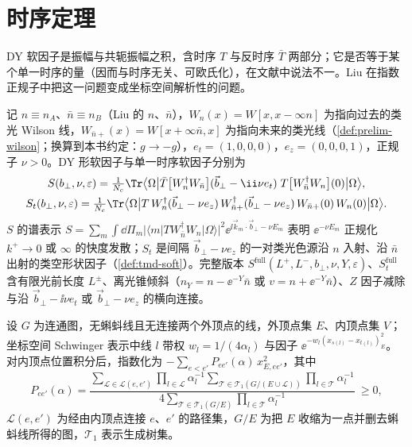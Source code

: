 \section{时序定理}\label{sec:yzliu-time-ordering}

DY 软因子是振幅与共轭振幅之积，含时序 $T$ 与反时序 $\bar T$ 两部分；它是否等于某个单一时序的量（因而与时序无关、可欧氏化），在文献中说法不一\cite{Moult:2018jzp}。Liu 在指数正规子中把这一问题变成坐标空间解析性的问题\cite{Liu:2023pjb}。

\begin{definition}[指数正规子下的软因子]\label{def:yzliu-exp-soft}
记 $n\equiv n_A$、$\bar n\equiv n_B$（Liu 的 $n$、$\bar n$），$W_n(x)=W[x,x-\infty n]$ 为指向过去的类光 Wilson 线，$W_{\bar n+}(x)=W[x+\infty\bar n,x]$ 为指向未来的类光线（\cref{def:prelim-wilson}；换算到本书约定：$g\to-g$），$e_t=(1,0,0,0)$，$e_z=(0,0,0,1)$，正规子 $\nu>0$\cite{Li:2016axz}。DY 形软因子与单一时序软因子分别为\cite[式~(3.7)、(3.20)]{Liu:2023pjb}
\begin{gather}
S(b_\perp,\nu,\varepsilon)=\tfrac{1}{N_c}\Tr\big\langle\Omega\big|\bar T\big[W_n^\dagger W_{\bar n}\big](\vec b_\perp-\ii\nu e_t)\;T\big[W_{\bar n}^\dagger W_n\big](0)\big|\Omega\big\rangle ,\label{eq:yzliu-S-exp}\\
S_t(b_\perp,\nu,\varepsilon)=\tfrac{1}{N_c}\Tr\big\langle\Omega\big|T\,W_n^\dagger(\vec b_\perp-\nu e_z)\,W_{\bar n+}^\dagger(\vec b_\perp-\nu e_z)\,W_{\bar n+}(0)\,W_n(0)\big|\Omega\big\rangle .\label{eq:yzliu-St}
\end{gather}
$S$ 的谱表示 $S=\sum_m\int\dd\Pi_m|\langle m|TW_{\bar n}^\dagger W_n|\Omega\rangle|^2\ee^{\ii\vec k_m\cdot\vec b_\perp-\nu E_m}$ 表明 $\ee^{-\nu E_m}$ 正规化 $k^+\to0$ 或 $\infty$ 的快度发散；$S_t$ 是间隔 $\vec b_\perp-\nu e_z$ 的一对类光色源沿 $n$ 入射、沿 $\bar n$ 出射的类空形状因子（\cref{def:tmd-soft}）。完整版本 $S^{\mathrm{full}}(L^+,L^-,b_\perp,\nu,Y,\varepsilon)$、$S_t^{\mathrm{full}}$ 含有限光前长度 $L^\pm$、离光锥倾斜（$n_Y=n-\ee^{-Y}\bar n$ 或 $v=n+\ee^{-Y}\bar n$）、$Z$ 因子减除与沿 $\vec b_\perp-\ii\nu e_t$ 或 $\vec b_\perp-\nu e_z$ 的横向连接。
\end{definition}

\begin{lemma}\label{lem:yzliu-matrix-tree}
设 $G$ 为连通图，无蝌蚪线且无连接两个外顶点的线，外顶点集 $E$、内顶点集 $V$；坐标空间 Schwinger 表示中线 $l$ 带权 $w_l=1/(4\alpha_l)$ 与因子 $\ee^{-w_l(x_{s(l)}-x_{t(l)})^2_E}$。对内顶点位置积分后，指数化为 $-\sum_{e<e'}P_{ee'}(\alpha)\,x^2_{E,ee'}$，其中
\begin{equation}\label{eq:yzliu-Pee}
P_{ee'}(\alpha)=\frac{\sum_{\mathcal L\in\mathcal L(e,e')}\prod_{l\in\mathcal L}\alpha_l^{-1}\sum_{\mathcal T\in\mathcal T_1(G/(E\cup\mathcal L))}\prod_{l\in\mathcal T}\alpha_l^{-1}}{4\sum_{\mathcal T\in\mathcal T_1(G/E)}\prod_{l\in\mathcal T}\alpha_l^{-1}}\ \ge0 ,
\end{equation}
$\mathcal L(e,e')$ 为经由内顶点连接 $e$、$e'$ 的路径集，$G/E$ 为把 $E$ 收缩为一点并删去蝌蚪线所得的图，$\mathcal T_1$ 表示生成树集\cite[式~(2.10)、附录~A]{Liu:2023pjb}。
\end{lemma}

